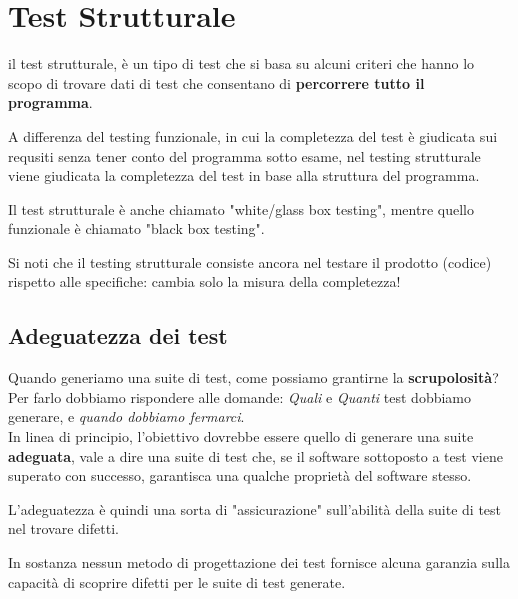 \chapter{Test Strutturale}
il test strutturale, è un tipo di test che si basa su alcuni criteri che hanno lo scopo di trovare dati di test che consentano di \textbf{percorrere tutto il programma}.

A differenza del testing funzionale, in cui la completezza del test è giudicata sui requsiti senza tener conto del programma sotto esame,
nel testing strutturale viene giudicata la completezza del test in base alla struttura del programma.

Il test strutturale è anche chiamato "white/glass box testing", mentre quello funzionale è chiamato "black box testing".

Si noti che il testing strutturale consiste ancora nel testare il prodotto (codice) rispetto alle specifiche: cambia solo la misura della completezza!




\section{Adeguatezza dei test}
Quando generiamo una suite di test, come possiamo grantirne la \textbf{scrupolosità}?
Per farlo dobbiamo rispondere alle domande: 
\emph{Quali} e \emph{Quanti} test dobbiamo generare, e \emph{quando dobbiamo fermarci}.
\\In linea di principio, l'obiettivo dovrebbe essere quello di generare una suite \textbf{adeguata},
vale a dire una suite di test che, se il software sottoposto a test viene superato con successo, garantisca
una qualche proprietà del software stesso.

L'adeguatezza è quindi una sorta di "assicurazione" sull'abilità della suite di test nel trovare difetti.

In sostanza nessun metodo di progettazione dei test fornisce alcuna garanzia sulla capacità di scoprire difetti per le suite di test generate.

